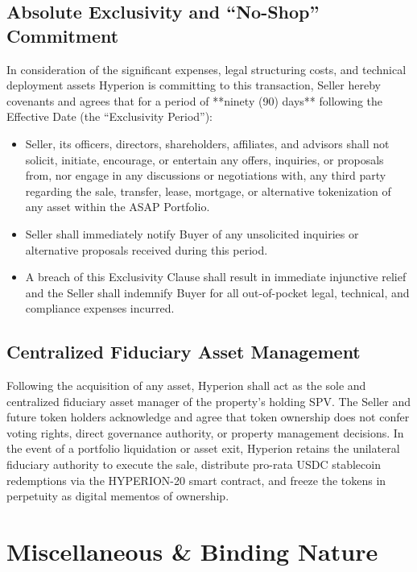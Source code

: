 \documentclass[11pt,a4paper]{article}
\begin{document}
\subsection{Absolute Exclusivity and ``No-Shop'' Commitment}
In consideration of the significant expenses, legal structuring costs, and technical deployment assets Hyperion is committing to this transaction, Seller hereby covenants and agrees that for a period of **ninety (90) days** following the Effective Date (the ``Exclusivity Period''):
\begin{itemize}
    \item Seller, its officers, directors, shareholders, affiliates, and advisors shall not solicit, initiate, encourage, or entertain any offers, inquiries, or proposals from, nor engage in any discussions or negotiations with, any third party regarding the sale, transfer, lease, mortgage, or alternative tokenization of any asset within the ASAP Portfolio.
    \item Seller shall immediately notify Buyer of any unsolicited inquiries or alternative proposals received during this period.
    \item A breach of this Exclusivity Clause shall result in immediate injunctive relief and the Seller shall indemnify Buyer for all out-of-pocket legal, technical, and compliance expenses incurred.
\end{itemize}

\subsection{Centralized Fiduciary Asset Management}
Following the acquisition of any asset, Hyperion shall act as the sole and centralized fiduciary asset manager of the property's holding SPV. The Seller and future token holders acknowledge and agree that token ownership does not confer voting rights, direct governance authority, or property management decisions. In the event of a portfolio liquidation or asset exit, Hyperion retains the unilateral fiduciary authority to execute the sale, distribute pro-rata USDC stablecoin redemptions via the HYPERION-20 smart contract, and freeze the tokens in perpetuity as digital mementos of ownership.

\clearpage

\section{Miscellaneous \& Binding Nature}
\end{document}
